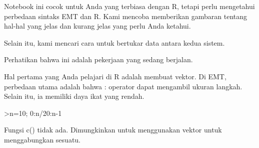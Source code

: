 \documentclass{article}
\begin{document}
\begin{eulernotebook}
\begin{eulercomment}
\begin{eulercomment}
\begin{eulercomment}
Notebook ini cocok untuk Anda yang terbiasa dengan R, tetapi perlu
mengetahui perbedaan sintaks EMT dan R. Kami mencoba memberikan
gambaran tentang hal-hal yang jelas dan kurang jelas yang perlu Anda
ketahui.

Selain itu, kami mencari cara untuk bertukar data antara kedua sistem.
\end{eulercomment}
\begin{eulercomment}
Perhatikan bahwa ini adalah pekerjaan yang sedang berjalan.
\end{eulercomment}
\begin{eulercomment}
Hal pertama yang Anda pelajari di R adalah membuat vektor. Di EMT,
perbedaan utama adalah bahwa : operator dapat mengambil ukuran
langkah. Selain itu, ia memiliki daya ikat yang rendah.
\end{eulercomment}
\begin{eulerprompt}
>n=10; 0:n/20:n-1
\end{eulerprompt}
\begin{euleroutput}
  [0,  0.5,  1,  1.5,  2,  2.5,  3,  3.5,  4,  4.5,  5,  5.5,  6,  6.5,
  7,  7.5,  8,  8.5,  9]
\end{euleroutput}
\begin{eulercomment}
Fungsi c() tidak ada. Dimungkinkan untuk menggunakan vektor untuk
menggabungkan sesuatu.


\end{eulercomment}
\end{eulercomment}
\end{eulercomment}
\end{eulernotebook}
\end{document}
